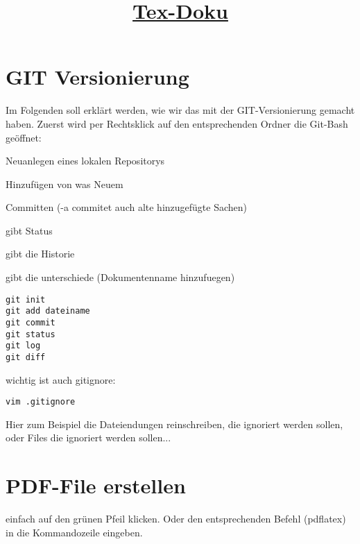 \documentclass[11pt]{scrartcl}
\begin{document}
\title{\underline{Tex-Doku}}
\maketitle
\section{GIT Versionierung}
Im Folgenden soll erklärt werden, wie wir das mit der GIT-Versionierung gemacht haben.
Zuerst wird per Rechtsklick auf den entsprechenden Ordner die Git-Bash geöffnet:

Neuanlegen eines lokalen Repositorys

Hinzufügen von was Neuem

Committen (-a commitet auch alte hinzugefügte Sachen)

gibt Status

gibt die Historie

gibt die unterschiede (Dokumentenname hinzufuegen)
\begin{lstlisting}
git init
git add dateiname
git commit
git status
git log
git diff
\end{lstlisting}

wichtig ist auch gitignore:
\begin{lstlisting}
vim .gitignore
\end{lstlisting}
Hier zum Beispiel die Dateiendungen reinschreiben, die ignoriert werden sollen, oder Files die ignoriert werden sollen...
\section{PDF-File erstellen}
einfach auf den grünen Pfeil klicken. Oder den entsprechenden Befehl (pdflatex) in die Kommandozeile eingeben.
\end{document}

